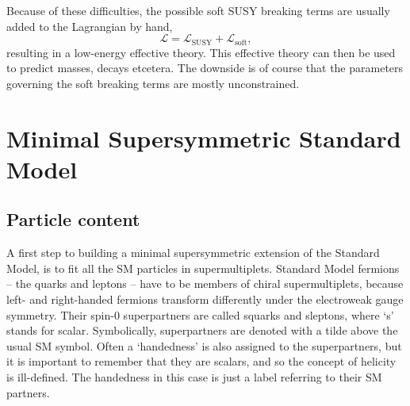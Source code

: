 Because of these difficulties, the possible soft SUSY breaking terms are usually added to the
Lagrangian by hand, 
\begin{equation}
  \mathcal{L} = \mathcal{L}_{\text{SUSY}} + \mathcal{L}_{\text{soft}},
  \label{eq:L_general}
\end{equation}
resulting in a low-energy effective theory. This effective theory can then be
used to predict masses, decays etcetera. The downside is of course that the parameters governing
the soft breaking terms are mostly unconstrained. 


\section{Minimal Supersymmetric Standard Model \label{sec:susy_MSSM}}

\subsection{Particle content \label{sec:susy_MSSM_particles}}

A first step to building a minimal supersymmetric extension of the Standard Model, is to fit all the
SM particles in supermultiplets. 
Standard Model fermions -- the quarks and leptons -- have to be members of chiral supermultiplets,
because left- and right-handed fermions transform differently under the electroweak gauge symmetry.
Their spin-0 superpartners are called squarks and sleptons, where `s' stands for scalar.
Symbolically, superpartners are denoted with a tilde above the usual SM symbol. 
Often a `handedness' is also assigned to the superpartners, but it is important to remember that
they are scalars, and so the concept of helicity is ill-defined. The handedness in this case is
just a label referring to their SM partners. 

